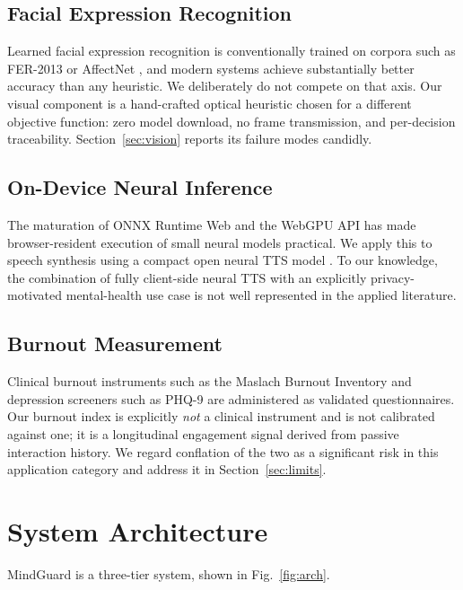 \documentclass[runningheads]{llncs}
\begin{document}
\subsection{Facial Expression Recognition}
Learned facial expression recognition is conventionally trained on corpora such
as FER-2013 \cite{fer2013} or AffectNet \cite{affectnet}, and modern systems
achieve substantially better accuracy than any heuristic. We deliberately do
not compete on that axis. Our visual component is a hand-crafted optical
heuristic chosen for a different objective function: zero model download, no
frame transmission, and per-decision traceability. Section~\ref{sec:vision}
reports its failure modes candidly.

\subsection{On-Device Neural Inference}
The maturation of ONNX Runtime Web \cite{onnxweb} and the WebGPU API
\cite{webgpu} has made browser-resident execution of small neural models
practical. We apply this to speech synthesis using a compact open neural TTS
model \cite{kokoro}. To our knowledge, the combination of fully client-side
neural TTS with an explicitly privacy-motivated mental-health use case is not
well represented in the applied literature.

\subsection{Burnout Measurement}
Clinical burnout instruments such as the Maslach Burnout Inventory
\cite{maslach} and depression screeners such as PHQ-9 \cite{phq9} are
administered as validated questionnaires. Our burnout index is explicitly
\emph{not} a clinical instrument and is not calibrated against one; it is a
longitudinal engagement signal derived from passive interaction history. We
regard conflation of the two as a significant risk in this application
category and address it in Section~\ref{sec:limits}.

\section{System Architecture}

MindGuard is a three-tier system, shown in Fig.~\ref{fig:arch}.
\end{document}
